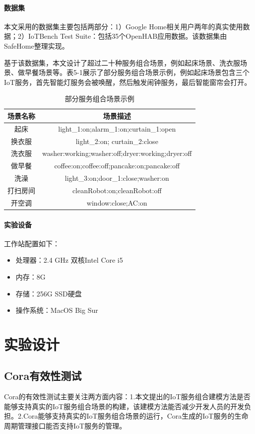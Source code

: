 \documentclass[winfonts,master,twoside]{njuthesis}
\begin{document}
\paragraph{数据集}
本文采用的数据集主要包括两部分：1）Google Home相关用户两年的真实使用数据；2）IoTBench Test Suite：包括35个OpenHAB应用数据\cite{iotbench}。该数据集由SafeHome整理实现。

基于该数据集，本文设计了超过二十种服务组合场景，例如起床场景、洗衣服场景、做早餐场景等。表5-1展示了部分服务组合场景示例，例如起床场景包含三个IoT服务，首先智能灯服务会被唤醒，然后触发闹钟服务，最后智能窗帘会打开。
\begin{table}[!htbp]
	\centering
	\begin{tabular}{cc}
		\toprule
		场景名称 & 场景描述 \\
		\midrule
		起床 & light\_1:on;alarm\_1:on;curtain\_1:open\\
		换衣服 & light\_2:on; curtain\_2:close\\
		洗衣服 & washer:working;washer:off;dryer:working;dryer:off\\
		做早餐 & coffee:on;coffee:off;pancake:on;pancake:off\\
		洗澡 & light\_3:on;door\_1:close;washer:on\\
		打扫房间 & cleanRobot:on;cleanRobot:off\\
		开空调 & window:close;AC:on\\
		\bottomrule
	\end{tabular}
	\caption{部分服务组合场景示例}
	\label{tbl:device_list}
\end{table}
\paragraph{实验设备}
工作站配置如下：
\begin{itemize}
    \item 处理器：2.4 GHz 双核Intel Core i5
    \item 内存：8G
    \item 存储：256G SSD硬盘
    \item 操作系统：MacOS Big Sur
\end{itemize}

\section{实验设计}
\subsection{Cora有效性测试}
Cora的有效性测试主要关注两方面内容：1.本文提出的IoT服务组合建模方法是否能够支持真实的IoT服务组合场景的构建，该建模方法能否减少开发人员的开发负担。2.Cora能够支持真实的IoT服务组合场景的运行，Cora生成的IoT服务的生命周期管理接口能否支持IoT服务的管理。
\end{document}
